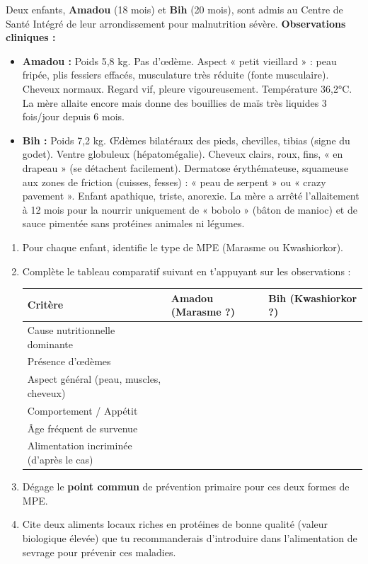 \documentclass[11pt]{article}
\newcounter{popsec}
\newcounter{popsub}
\newcommand{\courssub}[1]{%
  \stepcounter{popsub}%
  \par\vspace{9pt}\noindent{\popxbold\fontsize{11.5}{13}\selectfont\color{popink}{\color{poporange}\thepopsec.\thepopsub}\hspace{6pt}#1}\par\nopagebreak\vspace{4pt}
}
\begin{document}
\courssub{Je me prépare au Probatoire}

\begin{exercice}
Deux enfants, \textbf{Amadou} (18 mois) et \textbf{Bih} (20 mois), sont admis au Centre de Santé Intégré de leur arrondissement pour malnutrition sévère.
\medskip
\textbf{Observations cliniques :}
\begin{itemize}
    \item \textbf{Amadou :} Poids 5,8 kg. Pas d'œdème. Aspect « petit vieillard » : peau fripée, plis fessiers effacés, musculature très réduite (fonte musculaire). Cheveux normaux. Regard vif, pleure vigoureusement. Température 36,2°C. La mère allaite encore mais donne des bouillies de maïs très liquides 3 fois/jour depuis 6 mois.
    \item \textbf{Bih :} Poids 7,2 kg. Œdèmes bilatéraux des pieds, chevilles, tibias (signe du godet). Ventre globuleux (hépatomégalie). Cheveux clairs, roux, fins, « en drapeau » (se détachent facilement). Dermatose érythémateuse, squameuse aux zones de friction (cuisses, fesses) : « peau de serpent » ou « crazy pavement ». Enfant apathique, triste, anorexie. La mère a arrêté l'allaitement à 12 mois pour la nourrir uniquement de « bobolo » (bâton de manioc) et de sauce pimentée sans protéines animales ni légumes.
\end{itemize}
\begin{enumerate}
    \item Pour chaque enfant, identifie le type de MPE (Marasme ou Kwashiorkor).
    \item Complète le tableau comparatif suivant en t'appuyant sur les observations :
    \begin{center}
    \begin{tabularx}{\linewidth}{|l|X|X|}\hline
    \textbf{Critère} & \textbf{Amadou (Marasme ?)} & \textbf{Bih (Kwashiorkor ?)} \\ \hline
    Cause nutritionnelle dominante & & \\ \hline
    Présence d'œdèmes & & \\ \hline
    Aspect général (peau, muscles, cheveux) & & \\ \hline
    Comportement / Appétit & & \\ \hline
    Âge fréquent de survenue & & \\ \hline
    Alimentation incriminée (d'après le cas) & & \\ \hline
    \end{tabularx}
    \end{center}
    \item Dégage le \textbf{point commun} de prévention primaire pour ces deux formes de MPE.
    \item Cite deux aliments locaux riches en protéines de bonne qualité (valeur biologique élevée) que tu recommanderais d'introduire dans l'alimentation de sevrage pour prévenir ces maladies.
\end{enumerate}
\end{exercice}
\end{document}
